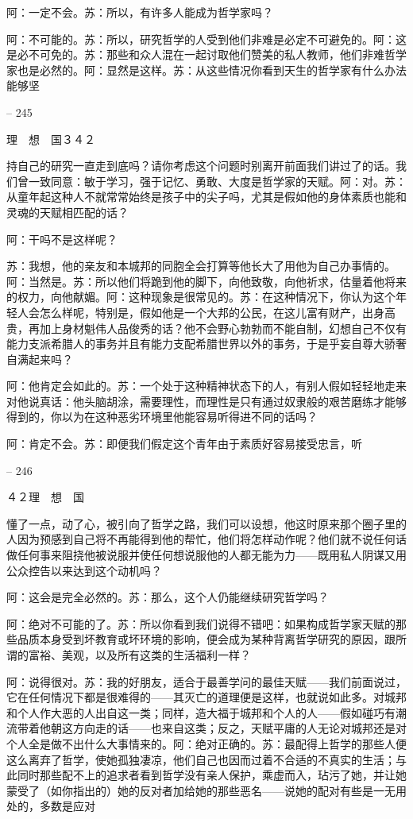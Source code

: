 \documentclass[11pt,oneside]{book}
\begin{document}
\begin{common-format}
    阿：一定不会。苏：所以，有许多人能成为哲学家吗？

    阿：不可能的。苏：所以，研究哲学的人受到他们非难是必定不可避免的。阿：这是必不可免的。苏：那些和众人混在一起讨取他们赞美的私人教师，他们非难哲学家也是必然的。阿：显然是这样。苏：从这些情况你看到天生的哲学家有什么办法能够坚

    

-- 245

    理　想　国３４２

    持自己的研究一直走到底吗？请你考虑这个问题时别离开前面我们讲过了的话。我们曾一致同意：敏于学习，强于记忆、勇敢、大度是哲学家的天赋。阿：对。苏：从童年起这种人不就常常始终是孩子中的尖子吗，尤其是假如他的身体素质也能和灵魂的天赋相匹配的话？

    阿：干吗不是这样呢？

    苏：我想，他的亲友和本城邦的同胞全会打算等他长大了用他为自己办事情的。阿：当然是。苏：所以他们将跪到他的脚下，向他致敬，向他祈求，估量着他将来的权力，向他献媚。阿：这种现象是很常见的。苏：在这种情况下，你认为这个年轻人会怎么样呢，特别是，假如他是一个大邦的公民，在这儿富有财产，出身高贵，再加上身材魁伟人品俊秀的话？他不会野心勃勃而不能自制，幻想自己不仅有能力支派希腊人的事务并且有能力支配希腊世界以外的事务，于是乎妄自尊大骄奢自满起来吗？

    阿：他肯定会如此的。苏：一个处于这种精神状态下的人，有别人假如轻轻地走来对他说真话：他头脑胡涂，需要理性，而理性是只有通过奴隶般的艰苦磨练才能够得到的，你以为在这种恶劣环境里他能容易听得进不同的话吗？

    阿：肯定不会。苏：即便我们假定这个青年由于素质好容易接受忠言，听

    

-- 246

    ４２理　想　国

    懂了一点，动了心，被引向了哲学之路，我们可以设想，他这时原来那个圈子里的人因为预感到自己将不再能得到他的帮忙，他们将怎样动作呢？他们就不说任何话做任何事来阻挠他被说服并使任何想说服他的人都无能为力——既用私人阴谋又用公众控告以来达到这个动机吗？

    阿：这会是完全必然的。苏：那么，这个人仍能继续研究哲学吗？

    阿：绝对不可能的了。苏：所以你看到我们说得不错吧：如果构成哲学家天赋的那些品质本身受到坏教育或坏环境的影响，便会成为某种背离哲学研究的原因，跟所谓的富裕、美观，以及所有这类的生活福利一样？

    阿：说得很对。苏：我的好朋友，适合于最善学问的最佳天赋——我们前面说过，它在任何情况下都是很难得的——其灭亡的道理便是这样，也就说如此多。对城邦和个人作大恶的人出自这一类；同样，造大福于城邦和个人的人——假如碰巧有潮流带着他朝这方向走的话——也来自这类；反之，天赋平庸的人无论对城邦还是对个人全是做不出什么大事情来的。阿：绝对正确的。苏：最配得上哲学的那些人便这么离弃了哲学，使她孤独凄凉，他们自己也因而过着不合适的不真实的生活；与此同时那些配不上的追求者看到哲学没有亲人保护，乘虚而入，玷污了她，并让她蒙受了（如你指出的）她的反对者加给她的那些恶名——说她的配对有些是一无用处的，多数是应对


\end{common-format}
\end{document}

